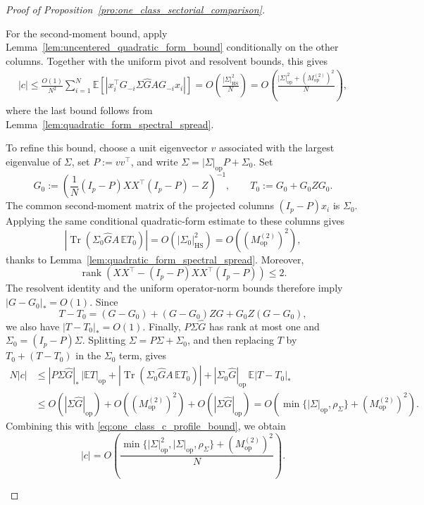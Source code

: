 \documentclass[EJP, preprint, NODS, nobera, nofontexpansion]{ejpecp}
\DeclareMathOperator{\op}{op}
\DeclareMathOperator{\tr}{Tr}
\DeclareMathOperator{\hs}{HS}
\begin{document}
\begin{proof}[Proof of Proposition~\ref{pro:one_class_sectorial_comparison}]
\begin{enumerate}
    For the second-moment bound, apply
    Lemma~\ref{lem:uncentered_quadratic_form_bound} conditionally on the
    other columns. Together with the uniform pivot and resolvent bounds,
    this gives
    \begin{align}
        \label{eq:one_class_c_profile_bound}
        |c|
        \leq\!\frac{O(1)}{N^2}\sum_{i=1}^N
            \mathbb E\left[
                \left|x_i^\top G_{-i}\Sigma\widehat GAG_{-i}x_i\right|
            \right]
        \!=O\!\left(\frac{|\Sigma|_{\hs}^2}{N}\right)
        \!=O\!\left(
            \frac{|\Sigma|_{\op}^2+(M_{\op}^{(2)})^2}{N}
        \right),
    \end{align}
    where the last bound follows from
    Lemma~\ref{lem:quadratic_form_spectral_spread}.

    To refine this bound, choose a unit eigenvector $v$ associated
    with the largest eigenvalue of $\Sigma$, set $P:=vv^\top$, and write
    $\Sigma=|\Sigma|_{\op}P+\Sigma_0$. Set
    \[
        G_0:=\left(
            \frac1N(I_p-P)XX^\top(I_p-P)-Z
        \right)^{-1},
        \qquad
        T_0:=G_0+G_0ZG_0.
    \]
    The common second-moment matrix of the projected columns $(I_p-P)x_i$ is $\Sigma_0$. Applying the
    same conditional quadratic-form estimate to these columns gives
    \[
        \left|\tr\!\left(\Sigma_0\widehat GA\,\mathbb ET_0\right)\right|
        =O\!\left(|\Sigma_0|_{\hs}^2\right)
        =O\!\left((M_{\op}^{(2)})^2\right),
    \]
    thanks to Lemma~\ref{lem:quadratic_form_spectral_spread}. Moreover,
    \[
        \operatorname{rank}\!\left(
            XX^\top-(I_p-P)XX^\top(I_p-P)
        \right)\leq2.
    \]
    The resolvent identity and the uniform operator-norm bounds
    therefore imply $|G-G_0|_*=O(1)$. Since
    \[
        T-T_0=(G-G_0)+(G-G_0)ZG+G_0Z(G-G_0),
    \]
    we also have $|T-T_0|_*=O(1)$.
    Finally, $P\Sigma\widehat G$ has rank at most one and
    $\Sigma_0=(I_p-P)\Sigma$. Splitting $\Sigma=P\Sigma+\Sigma_0$, and
    then replacing $T$ by $T_0+(T-T_0)$ in the $\Sigma_0$ term, gives
    \begin{align*}
        N|c|
        &\leq
        |P\Sigma\widehat G|_*\,|\mathbb ET|_{\op}
        +\left|\tr\!\left(\Sigma_0\widehat GA\,\mathbb ET_0\right)\right|
        +|\Sigma_0\widehat G|_{\op}\,\mathbb E|T-T_0|_*
        \\
        &\leq
        O(|\Sigma\widehat G|_{\op})
        +O\!\left((M_{\op}^{(2)})^2\right)
        +O(|\Sigma\widehat G|_{\op})
        =O\!\left(
            \min\{|\Sigma|_{\op},\rho_\Sigma\}
            +(M_{\op}^{(2)})^2
        \right).
    \end{align*}
    Combining this with \eqref{eq:one_class_c_profile_bound}, we obtain
    \begin{equation}
    \label{eq:one_class_c_refined_bound}
        |c|=O\!\left(
            \frac{
                \min\{|\Sigma|_{\op}^2,|\Sigma|_{\op},\rho_\Sigma\}
                +(M_{\op}^{(2)})^2
            }{N}
        \right).
    \end{equation}
\end{enumerate}


\end{proof}
\end{document}

